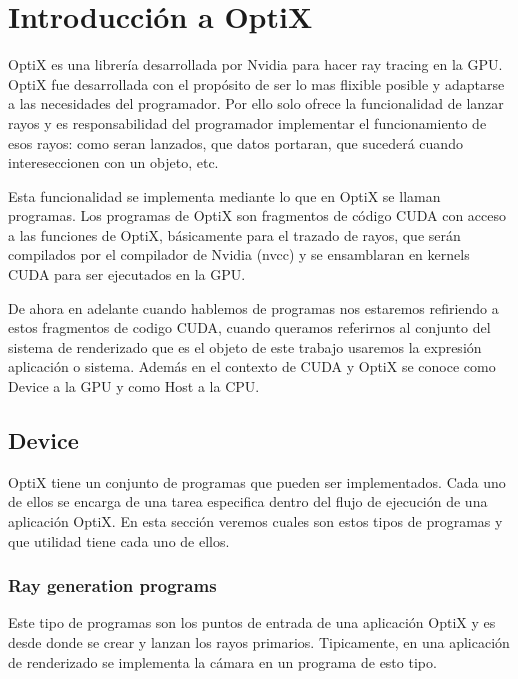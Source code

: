 \chapter{Introducción a OptiX}


OptiX es una librería desarrollada por Nvidia para hacer ray tracing en la GPU. OptiX fue desarrollada con el propósito de ser lo mas flixible posible y adaptarse a las necesidades del programador. Por ello solo ofrece la funcionalidad de lanzar rayos y es responsabilidad del programador implementar el funcionamiento de esos rayos: como seran lanzados, que datos portaran, que sucederá cuando intereseccionen con un objeto, etc.

\medskip

Esta funcionalidad se implementa mediante lo que en OptiX se llaman programas. Los programas de OptiX son fragmentos de código CUDA con acceso a las funciones de OptiX, básicamente para el trazado de rayos, que serán compilados por el compilador de Nvidia (nvcc) y se ensamblaran en kernels CUDA para ser ejecutados en la GPU. 

\medskip
De ahora en adelante cuando hablemos de programas nos estaremos refiriendo a estos fragmentos de codigo CUDA, cuando queramos referirnos al conjunto del sistema de renderizado que es el objeto de este trabajo usaremos la expresión aplicación o sistema. Además en el contexto de CUDA y OptiX se conoce como Device a la GPU y como Host a la CPU.

\clearpage

\section{Device}

OptiX tiene un conjunto de programas que pueden ser implementados. Cada uno de ellos se encarga de una tarea especifica dentro del flujo de ejecución de una aplicación OptiX. En esta sección veremos cuales son estos tipos de programas y que utilidad tiene cada uno de ellos.  

\subsection{Ray generation programs}

Este tipo de programas son los puntos de entrada de una aplicación OptiX y es desde donde se crear y lanzan los rayos primarios. Tipicamente, en una aplicación de renderizado se implementa la cámara en un programa de esto tipo.

